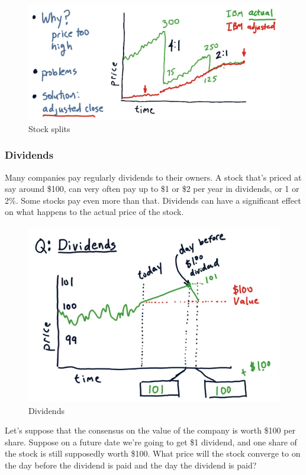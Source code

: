 \documentclass[12pt]{article}
\begin{document}
\begin{figure}[!ht]
\centering
\includegraphics[scale=0.4]{fig/fig51}
\caption{Stock splits}
\end{figure}

\subsubsection{Dividends}

Many companies pay regularly dividends to their owners. A stock that's priced at say around \$100, can very often pay up to \$1 or \$2 per year in dividends, or 1 or 2\%. Some stocks pay even more than that. Dividends can have a significant effect on what happens to the actual price of the stock. 

\begin{figure}[!ht]
\centering
\includegraphics[scale=0.45]{fig/fig52}
\caption{Dividends}
\end{figure}

Let's suppose that the consensus on the value of the company is worth \$100 per share. Suppose on a future date we're going to get \$1 dividend, and one share of the stock is still supposedly worth \$100. What price will the stock converge to on the day before the dividend is paid and the day the dividend is paid? 
\end{document}
